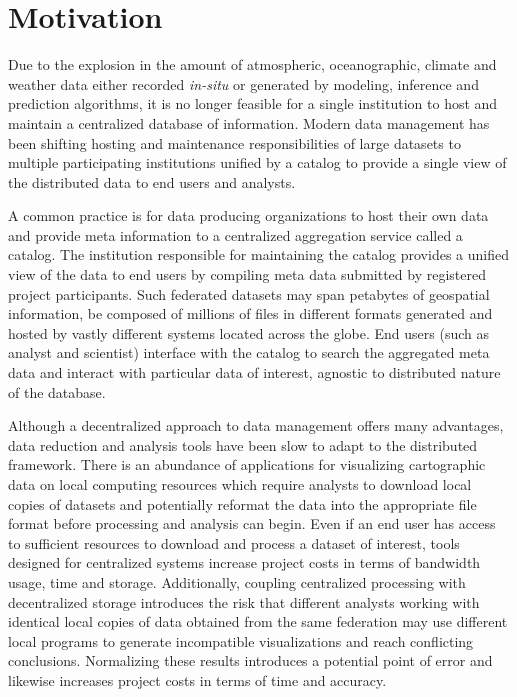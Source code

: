 \section{Motivation}
\label{sec:motivation}
Due to the explosion in the amount of atmospheric, oceanographic,
climate and weather data either recorded \emph{in-situ} or generated
by modeling, inference and prediction algorithms, it is no longer
feasible for a single institution to host and maintain a centralized
database of information. Modern data management has been shifting
hosting and maintenance responsibilities of large datasets to multiple
participating institutions unified by a catalog to provide a single
view of the distributed data to end users and analysts.

A common practice is for data producing organizations to host their
own data and provide meta information to a centralized aggregation
service called a catalog. The institution responsible for
maintaining the catalog provides a unified view of the data to end
users by compiling meta data submitted by registered project
participants. Such federated datasets may span petabytes of geospatial
information, be composed of millions of files in different formats
generated and hosted by vastly different systems located across the
globe. End users (such as analyst and scientist) interface with the
catalog to search the aggregated meta data and interact with
particular data of interest, agnostic to distributed nature of the
database.

Although a decentralized approach to data management offers many
advantages, data reduction and analysis tools have been slow to adapt
to the distributed framework. There is an abundance of applications
for visualizing cartographic data on local computing resources which
require analysts to download local copies of datasets and
potentially reformat the data into the appropriate file format before
processing and analysis can begin. Even if an end user has access to
sufficient resources to download and process a dataset of interest,
tools designed for centralized systems increase project costs in terms
of bandwidth usage, time and storage. Additionally, coupling
centralized processing with decentralized storage introduces the risk
that different analysts working with identical local copies of data
obtained from the same federation may use different local programs to
generate incompatible visualizations and reach conflicting
conclusions. Normalizing these results introduces a potential point of
error and likewise increases project costs in terms of time
and accuracy.

